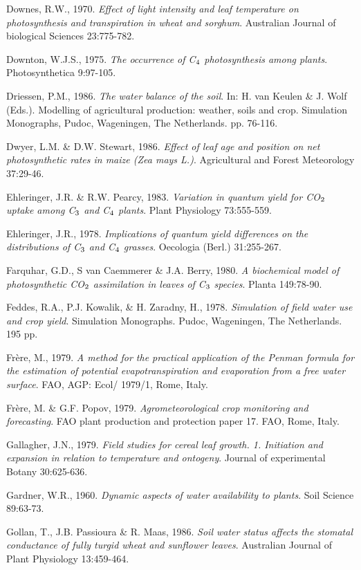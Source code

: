 Downes, R.W., 1970. {\it Effect of light intensity and leaf temperature on photosynthesis and
transpiration in wheat and sorghum\/}. Australian Journal of biological Sciences 23:775-782.

Downton, W.J.S., 1975. {\it The occurrence of C$_{{\rm 4}}$ photosynthesis among plants\/}. Photosynthetica
9:97-105.

Driessen, P.M., 1986. {\it The water balance of the soil\/}. In: H. van Keulen \& J. Wolf (Eds.).
Modelling of agricultural production: weather, soils and crop. Simulation Monographs,
Pudoc, Wageningen, The Netherlands. pp. 76-116.

Dwyer, L.M. \& D.W. Stewart, 1986. {\it Effect of leaf age and position on net photosynthetic
rates in maize (Zea mays L.)\/}. Agricultural and Forest Meteorology 37:29-46.

Ehleringer, J.R. \& R.W. Pearcy, 1983. {\it Variation in quantum yield for CO$_{{\rm 2}}$ uptake among
C$_{{\rm 3}}$ and C$_{{\rm 4}}$ plants\/}. Plant Physiology 73:555-559.

Ehleringer, J.R., 1978. {\it Implications of quantum yield differences on the distributions of C$_{{\rm 3}}$
and C$_{{\rm 4}}$ grasses\/}. Oecologia (Berl.) 31:255-267.

Farquhar, G.D., S van Caemmerer \& J.A. Berry, 1980. {\it A biochemical model of
photosynthetic CO$_{{\rm 2}}$ assimilation in leaves of C$_{{\rm 3}}$ species\/}. Planta 149:78-90.

Feddes, R.A., P.J. Kowalik, \& H. Zaradny, H., 1978. {\it Simulation of field water use and
crop yield\/}. Simulation Monographs. Pudoc, Wageningen, The Netherlands. 195 pp.

Fr\`{e}re, M., 1979. {\it A method for the practical application of the Penman formula for the
estimation of potential evapotranspiration and evaporation from a free water surface\/}. FAO,
AGP: Ecol/ 1979/1, Rome, Italy.

Fr\`{e}re, M. \& G.F. Popov, 1979. {\it Agrometeorological crop monitoring and forecasting\/}. FAO
plant production and protection paper 17. FAO, Rome, Italy.

Gallagher, J.N., 1979. {\it Field studies for cereal leaf growth. 1. Initiation and expansion in
relation to temperature and ontogeny\/}. Journal of experimental Botany 30:625-636.

Gardner, W.R., 1960. {\it Dynamic aspects of water availability to plants\/}. Soil Science 89:63-73.

Gollan, T., J.B. Passioura \& R. Maas, 1986. {\it Soil water status affects the stomatal
conductance of fully turgid wheat and sunflower leaves\/}. Australian Journal of Plant
Physiology 13:459-464.

